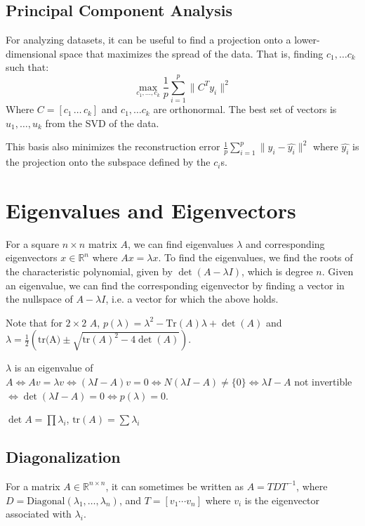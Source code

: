 \documentclass[10pt]{extarticle}
\newcommand{\R}{\mathbb{R}}
\begin{document}
\begin{multicols*}{2}
\subsection{Principal Component Analysis}
For analyzing datasets, it can be useful to find a projection onto a lower-dimensional space that maximizes the spread of the data. That is, finding $c_1, \ldots c_k$ such that:
\[ \max_{c_1, \ldots, c_k} \frac{1}{p} \sum_{i=1}^{p} \| C^T y_i \|^2 \]
Where $C = [c_1\, \ldots \, c_k]$ and $c_1, \ldots c_k$ are orthonormal. The best set of vectors is $u_1, \ldots, u_k$ from the SVD of the data.

This basis also minimizes the reconstruction error $\frac{1}{p} \sum_{i=1}^p \| y_i - \hat{y_i}\|^2$ where $\hat{y_i}$ is the projection onto the subspace defined by the $c_i$s. 



\section{Eigenvalues and Eigenvectors}
For a square $n \times n$ matrix $A$, we can find eigenvalues $\lambda$ and corresponding eigenvectors $x \in \R^n$ where $Ax = \lambda x$.
To find the eigenvalues, we find the roots of the characteristic polynomial, given by $\det(A - \lambda I)$, which is degree $n$. Given an eigenvalue, we can find the corresponding eigenvector by finding a vector in the nullspace of $A - \lambda I$, i.e. a vector for which the above holds.

Note that for $2 \times 2$ $A$, $p(\lambda) = \lambda^2 - \text{Tr}(A)\lambda + \det(A)$ and $\lambda = \frac{1}{2}\left(\text{tr(A)} \pm \sqrt{\text{tr}(A)^2 - 4\det(A)}\right)$.

\begin{compactitem}
\item $\lambda$ is an eigenvalue of $A \iff Av = \lambda v \iff (\lambda I - A)v = 0 \iff N(\lambda I - A) \neq \{0\} \iff \lambda I - A$ not invertible $\iff \det(\lambda I - A) = 0 \iff p(\lambda) = 0$.
\item $\det A = \prod \lambda_i$, $\text{tr}(A) = \sum \lambda_i$
\end{compactitem}

\subsection{Diagonalization}
For a matrix $A \in \R^{n \times n}$, it can sometimes be written as $A = TDT^{-1}$, where $D = \text{Diagonal}(\lambda_1, \ldots, \lambda_n)$, and $T = [v_1 \cdots v_n]$ where $v_i$ is the eigenvector associated with $\lambda_i$.


\end{multicols*}
\end{document}
